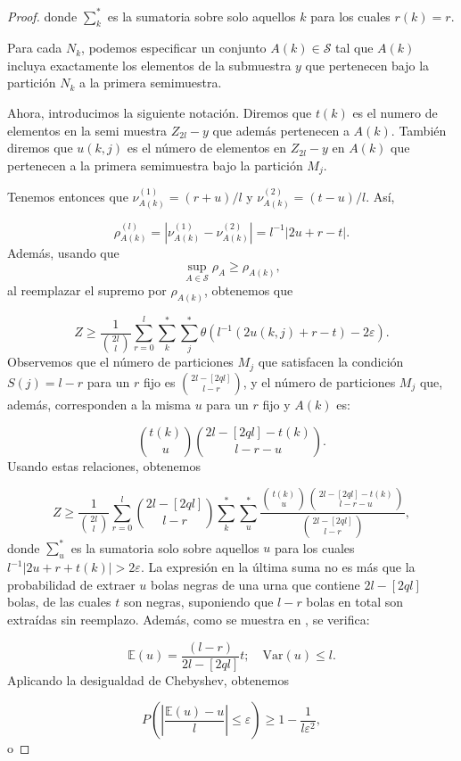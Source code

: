 \documentclass{report}
\begin{document}
\begin{proof}
donde \( \displaystyle\sum_k^* \) es la sumatoria sobre solo aquellos \( k \) para los cuales \( r(k) = r \).

Para cada \( N_k \), podemos especificar un conjunto \( A(k) \in \mathcal{S} \) tal que \( A(k) \) incluya exactamente
los elementos de la submuestra \( y \) que pertenecen bajo la partición \( N_k \) a la primera semimuestra.

Ahora, introducimos la siguiente notación. Diremos que $t(k)$ es el numero de elementos en la semi muestra $Z_{2l} - y$ que
además pertenecen a $A(k)$. También diremos que  \( u(k,j) \) es el número de elementos en \( Z_{2l} - y \) en \( A(k) \)
que pertenecen a la primera semimuestra bajo la partición \( M_j \).

Tenemos entonces que \( \nu_{A(k)}^{(1)} = (r + u)/l \) y \( \nu_{A(k)}^{(2)} = (t - u)/l \).
Así,

\[
\rho^{(l)}_{A(k)} = |\nu_{A(k)}^{(1)} - \nu_{A(k)}^{(2)}| = l^{-1} | 2u + r - t |.
\]
Además, usando que
\[
\sup_{A \in \mathcal{S}} \rho_A \geq \rho_{A(k)},
\]
al reemplazar el supremo por $\rho_{A(k)}$, obtenemos que

\[
Z \geq \frac{1}{\binom{2l}{l}} \sum_{r=0}^{l} \sum_k^* \sum_j^* \theta ( l^{-1} (2u(k,j) + r - t) - 2\varepsilon ).
\]
Observemos que el número de particiones \( M_j \) que satisfacen la condición \( S(j) = l - r \) para un \( r \) fijo es
\( \binom{2l - [2q l]}{l - r} \), y el número de particiones \( M_j \) que, además, corresponden a la misma \( u \) para un \( r \) fijo
y \( A(k) \) es:

\[
\binom{t(k)}{u} \binom{2l - [2q l] - t(k)}{l - r - u}.
\]
Usando estas relaciones, obtenemos

\[
Z \geq \frac{1}{\binom{2l}{l}} \sum_{r=0}^{l} \binom{2l - [2q l]}{l - r} \sum_k^* \sum_u^* \frac{\binom{t(k)}{u} \binom{2l - [2q l] - t(k)}{l - r - u}}{\binom{2l - [2q l]}{l - r}},
\]
donde \( \sum_u^* \) es la sumatoria solo sobre aquellos \( u \) para los cuales \( l^{-1} |2u + r + t(k)| > 2\varepsilon \).
La expresión en la última suma no es más que la probabilidad de extraer \( u \) bolas negras de una urna que contiene
\( 2l - [2q l] \) bolas, de las cuales \( t \) son negras, suponiendo que \( l - r \) bolas en total son extraídas sin reemplazo.
Además, como se muestra en \cite{feller1957}, se verifica:

\[
\mathbb{E}(u) = \frac{(l - r)}{2l - [2q l]} t; \quad \text{Var}(u) \leq l.
\]
Aplicando la desigualdad de Chebyshev, obtenemos

\[
P \left( \left| \frac{\mathbb{E}(u) - u}{l} \right| \leq \varepsilon \right) \geq 1 - \frac{1}{l \varepsilon^2},
\]
o


\end{proof}
\end{document}
